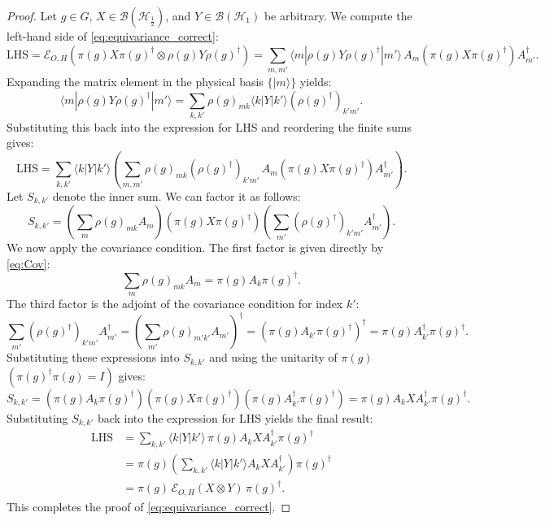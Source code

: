 \documentclass[12pt,a4paper]{article}
\begin{document}
\begin{proof}
Let $g \in G$, $X \in \mathcal{B}(\mathcal{H}_{\frac{1}{2}})$, and $Y \in \mathcal{B}(\mathcal{H}_{1})$ be arbitrary. We compute the left-hand side of \eqref{eq:equivariance_correct}:
\[
\mathrm{LHS} = \mathcal{E}_{O,H}\left( \pi(g) X \pi(g)^\dagger \otimes \rho(g) Y \rho(g)^\dagger \right) = \sum_{m, m'} \langle m | \rho(g) Y \rho(g)^\dagger | m' \rangle \, A_m \left( \pi(g) X \pi(g)^\dagger \right) A_{m'}^\dagger.
\]
Expanding the matrix element in the physical basis $\{|m\rangle\}$ yields:
\[
\langle m | \rho(g) Y \rho(g)^\dagger | m' \rangle = \sum_{k, k'} \rho(g)_{m k} \langle k | Y | k' \rangle (\rho(g)^\dagger)_{k' m'}.
\]
Substituting this back into the expression for LHS and reordering the finite sums gives:
\[
\mathrm{LHS} = \sum_{k, k'} \langle k | Y | k' \rangle \left( \sum_{m, m'} \rho(g)_{m k} (\rho(g)^\dagger)_{k' m'} \, A_m \left( \pi(g) X \pi(g)^\dagger \right) A_{m'}^\dagger \right).
\]
Let $S_{k,k'}$ denote the inner sum. We can factor it as follows:
\[
S_{k,k'} = \left( \sum_{m} \rho(g)_{m k} A_m \right) \left( \pi(g) X \pi(g)^\dagger \right) \left( \sum_{m'} (\rho(g)^\dagger)_{k' m'} A_{m'}^\dagger \right).
\]
We now apply the covariance condition. The first factor is given directly by \eqref{eq:Cov}:
\[
\sum_{m} \rho(g)_{m k} A_m = \pi(g) A_k \pi(g)^\dagger.
\]
The third factor is the adjoint of the covariance condition for index $k'$:
\[
\sum_{m'} (\rho(g)^\dagger)_{k' m'} A_{m'}^\dagger = \left( \sum_{m'} \rho(g)_{m' k'} A_{m'} \right)^\dagger = \left( \pi(g) A_{k'} \pi(g)^\dagger \right)^\dagger = \pi(g) A_{k'}^\dagger \pi(g)^\dagger.
\]
Substituting these expressions into $S_{k,k'}$ and using the unitarity of $\pi(g)$ $(\pi(g)^\dagger \pi(g) = I)$ gives:
\[
S_{k,k'} = \left( \pi(g) A_k \pi(g)^\dagger \right) \left( \pi(g) X \pi(g)^\dagger \right) \left( \pi(g) A_{k'}^\dagger \pi(g)^\dagger \right) = \pi(g) A_k X A_{k'}^\dagger \pi(g)^\dagger.
\]
Substituting $S_{k,k'}$ back into the expression for LHS yields the final result:
\begin{align*}
\mathrm{LHS} &= \sum_{k, k'} \langle k | Y | k' \rangle \, \pi(g) A_k X A_{k'}^\dagger \pi(g)^\dagger \\
&= \pi(g) \left( \sum_{k, k'} \langle k | Y | k' \rangle A_k X A_{k'}^\dagger \right) \pi(g)^\dagger \\
&= \pi(g) \, \mathcal{E}_{O,H}(X \otimes Y) \, \pi(g)^\dagger.
\end{align*}
This completes the proof of \eqref{eq:equivariance_correct}.
\end{proof}
\end{document}

